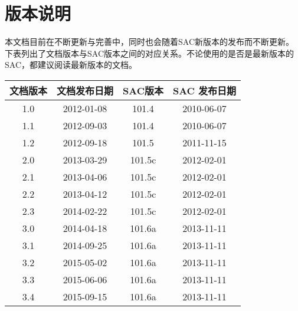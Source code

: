 {\section*{版本说明}}

本文档目前在不断更新与完善中，同时也会随着SAC新版本的发布而不断更新。
下表列出了文档版本与SAC版本之间的对应关系。不论使用的是否是最新版本的
SAC，都建议阅读最新版本的文档。

\begin{table}[H]
\centering
\begin{tabular}{cccc}
\toprule
文档版本    &   文档发布日期    &   SAC版本 &   SAC 发布日期\\
\midrule
1.0         &   2012-01-08      &   101.4   &   2010-06-07  \\
1.1         &   2012-09-03      &   101.4   &   2010-06-07  \\
1.2         &   2012-09-18      &   101.5   &   2011-11-15  \\
2.0         &   2013-03-29      &   101.5c  &   2012-02-01  \\
2.1         &   2013-04-06      &   101.5c  &   2012-02-01  \\
2.2         &   2013-04-12      &   101.5c  &   2012-02-01  \\
2.3         &   2014-02-22      &   101.5c  &   2012-02-01  \\
3.0         &   2014-04-18      &   101.6a  &   2013-11-11  \\
3.1         &   2014-09-25      &   101.6a  &   2013-11-11  \\
3.2         &   2015-05-02      &   101.6a  &   2013-11-11  \\
3.3         &   2015-06-06      &   101.6a  &   2013-11-11  \\
3.4         &   2015-09-15      &   101.6a  &   2013-11-11  \\
\bottomrule
\end{tabular}
\end{table}
